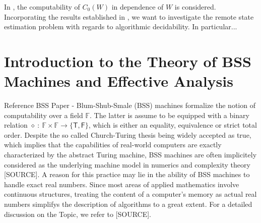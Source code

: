 \documentclass[conference]{IEEEtran}
\def\FF{{\mathbb F}}
\newcommand{\sdummy}{{\color{red}[SOURCE]}}
\begin{document}
	In \cite{BD20Z}, the computability of \(C_0(W)\) in dependence of \(W\) is considered. Incorporating the results established in \cite{BD20Z}, 
	we want to investigate the remote state estimation problem with regards to algorithmic decidability. In particular...

\section{Introduction to the Theory of BSS Machines and Effective Analysis}
	{\color{red} Reference BSS Paper - }
	Blum-Shub-Smale (BSS) machines formalize the notion of computability over a field \(\FF\). The latter is assume to be equipped 
	with a binary relation \(\diamond~{:}~\FF \times \FF \rightarrow \{\mathsf{T},\mathsf{F}\}\), which is either an equality, equivalence or strict total order. 
	Despite the so called Church-Turing thesis being widely accepted as true, which implies that the capabilities of real-world computers are exactly characterized 
	by the abstract Turing machine, BSS machines are often implicitely considered as the underlying machine model in numerics and complexity theory \sdummy. 
	A reason for this practice may lie in the ability of BSS machines to handle exact real numbers. Since most areas of applied mathematics involve continuous structures, 
	treating the content of a computer's memory as actual real numbers simplifys the description of algorithms to a great extent. For a detailed discussion on the Topic, we refer to \sdummy.
\end{document}
